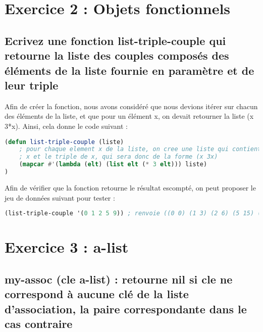 \documentclass[a4paper, 12pt]{article}
\begin{document}
\newpage

\section{Exercice 2 : Objets fonctionnels}

\subsection{Ecrivez une fonction list-triple-couple qui retourne la liste des couples composés des éléments de la liste fournie en paramètre et de leur triple}
\vspace{3mm}

Afin de créer la fonction, nous avons considéré que nous devions itérer sur chacun des éléments de la liste, et que pour un élément x, on devait retourner la liste (x 3*x). Ainsi, cela donne le code suivant :
\vspace{2mm}

\begin{lstlisting}[language=Lisp]
(defun list-triple-couple (liste)
    ; pour chaque element x de la liste, on cree une liste qui contient
    ; x et le triple de x, qui sera donc de la forme (x 3x)
    (mapcar #'(lambda (elt) (list elt (* 3 elt))) liste)
)
\end{lstlisting}
\vspace{2mm}

Afin de vérifier que la fonction retourne le résultat escompté, on peut proposer le jeu de données suivant pour tester :
\vspace{2mm}

\begin{lstlisting}[language=Lisp]
(list-triple-couple '(0 1 2 5 9)) ; renvoie ((0 0) (1 3) (2 6) (5 15) (9 27))
\end{lstlisting}


\newpage

\section{Exercice 3 : a-list}

\subsection{my-assoc (cle a-list) : retourne nil si cle ne correspond à aucune clé de la liste d'association, la paire correspondante dans le cas contraire}
\vspace{3mm}
\end{document}
